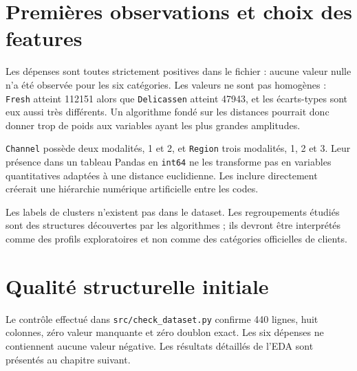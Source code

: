 \section{Premières observations et choix des features}
Les dépenses sont toutes strictement positives dans le fichier : aucune valeur nulle n'a été observée pour les six catégories. Les valeurs ne sont pas homogènes : \texttt{Fresh} atteint 112151 alors que \texttt{Delicassen} atteint 47943, et les écarts-types sont eux aussi très différents. Un algorithme fondé sur les distances pourrait donc donner trop de poids aux variables ayant les plus grandes amplitudes.

\texttt{Channel} possède deux modalités, 1 et 2, et \texttt{Region} trois modalités, 1, 2 et 3. Leur présence dans un tableau Pandas en \texttt{int64} ne les transforme pas en variables quantitatives adaptées à une distance euclidienne. Les inclure directement créerait une hiérarchie numérique artificielle entre les codes.

\begin{precaution}
Les labels de clusters n'existent pas dans le dataset. Les regroupements étudiés sont des structures découvertes par les algorithmes ; ils devront être interprétés comme des profils exploratoires et non comme des catégories officielles de clients.
\end{precaution}

\section{Qualité structurelle initiale}
Le contrôle effectué dans \texttt{src/check\_dataset.py} confirme 440 lignes, huit colonnes, zéro valeur manquante et zéro doublon exact. Les six dépenses ne contiennent aucune valeur négative. Les résultats détaillés de l'EDA sont présentés au chapitre suivant.
